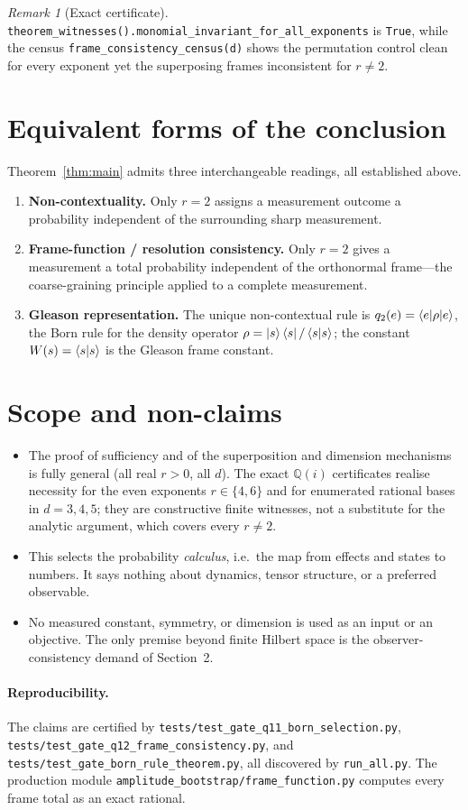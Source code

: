 \documentclass[11pt,a4paper]{article}
\theoremstyle{definition}
\theoremstyle{remark}
\newtheorem{remark}{Remark}
\newcommand{\Q}{\mathbb{Q}}
\begin{document}
\begin{remark}[Exact certificate]
\texttt{theorem\_witnesses().monomial\_invariant\_for\_all\_exponents} is \texttt{True},
while the census \texttt{frame\_consistency\_census(d)} shows the permutation control clean
for every exponent yet the superposing frames inconsistent for $r\neq 2$.
\end{remark}

\section{Equivalent forms of the conclusion}

Theorem~\ref{thm:main} admits three interchangeable readings, all established above.
\begin{enumerate}
\item \textbf{Non-contextuality.} Only $r=2$ assigns a measurement outcome a probability
independent of the surrounding sharp measurement.
\item \textbf{Frame-function / resolution consistency.} Only $r=2$ gives a measurement a
total probability independent of the orthonormal frame---the coarse-graining principle
applied to a complete measurement.
\item \textbf{Gleason representation.} The unique non-contextual rule is
$q_2(e)=\braket{e|\rho|e}$, the Born rule for the density operator
$\rho=\ket{s}\bra{s}/\braket{s|s}$; the constant $W(s)=\braket{s|s}$ is the Gleason frame
constant.
\end{enumerate}

\section{Scope and non-claims}

\begin{itemize}
\item The proof of sufficiency and of the superposition and dimension mechanisms is fully
general (all real $r>0$, all $d$). The exact $\Q(i)$ certificates realise necessity for the
even exponents $r\in\{4,6\}$ and for enumerated rational bases in $d=3,4,5$; they are
constructive finite witnesses, not a substitute for the analytic argument, which covers every
$r\neq 2$.
\item This selects the probability \emph{calculus}, i.e.\ the map from effects and states to
numbers. It says nothing about dynamics, tensor structure, or a preferred observable.
\item No measured constant, symmetry, or dimension is used as an input or an objective. The
only premise beyond finite Hilbert space is the observer-consistency demand of Section~2.
\end{itemize}

\paragraph{Reproducibility.}
The claims are certified by
\texttt{tests/test\_gate\_q11\_born\_selection.py},
\texttt{tests/test\_gate\_q12\_frame\_consistency.py}, and
\texttt{tests/test\_gate\_born\_rule\_theorem.py}, all discovered by \texttt{run\_all.py}.
The production module \texttt{amplitude\_bootstrap/frame\_function.py} computes every frame
total as an exact rational.
\end{document}
